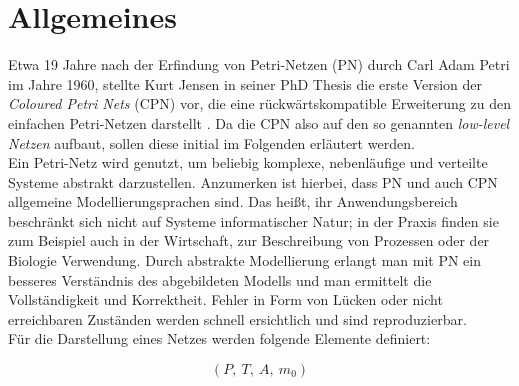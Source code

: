 \documentclass[11pt,onecolumn,a4paper,DIV=calc]{scrartcl}
\begin{document}
\section[Allgemeines]{Allgemeines}
Etwa 19 Jahre nach der Erfindung von Petri-Netzen (PN) durch Carl Adam Petri im Jahre 1960, stellte Kurt Jensen in seiner PhD Thesis die erste Version der \textit{Coloured Petri Nets} (CPN) vor, die eine rückwärtskompatible Erweiterung zu den einfachen Petri-Netzen darstellt \cite{CPN}. Da die CPN also auf den so genannten \textit{low-level Netzen} aufbaut, sollen diese initial im Folgenden erläutert werden.\\
\newline
Ein Petri-Netz wird genutzt, um beliebig komplexe, nebenläufige und verteilte Systeme abstrakt darzustellen. Anzumerken ist hierbei, dass PN und auch CPN allgemeine Modellierungsprachen sind. Das heißt, ihr Anwendungsbereich beschränkt sich nicht auf Systeme informatischer Natur; in der Praxis finden sie zum Beispiel auch in der Wirtschaft, zur Beschreibung von Prozessen oder der Biologie Verwendung. Durch abstrakte Modellierung erlangt man mit PN ein besseres Verständnis des abgebildeten Modells und man ermittelt die Vollständigkeit und Korrektheit. Fehler in Form von Lücken oder nicht erreichbaren Zuständen werden schnell ersichtlich und sind reproduzierbar. \\
Für die Darstellung eines Netzes werden folgende Elemente definiert:
\begin{center}
\[(P,\ T,\ A,\ m_0)\] \\
\end{center}
\end{document}
